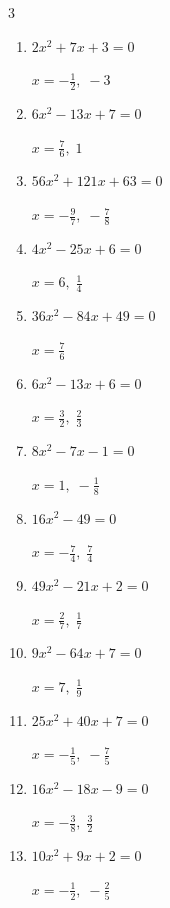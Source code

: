 \begin{multicols}{3}
\begin{enumerate}
  \item $2x^{2}+7x+3=0$

        $\displaystyle x=-\frac{1}{2},\; -3$

  \item $6x^{2}-13x+7=0$

        $\displaystyle x=\frac{7}{6},\; 1$

  \item $56x^{2}+121x+63=0$

        $\displaystyle x=-\frac{9}{7},\; -\frac{7}{8}$

  \item $4x^{2}-25x+6=0$

        $\displaystyle x=6,\; \frac{1}{4}$

  \item $36x^{2}-84x+49=0$

        $\displaystyle x=\frac{7}{6}$

  \item $6x^{2}-13x+6=0$

        $\displaystyle x=\frac{3}{2},\; \frac{2}{3}$

  \item $8x^{2}-7x-1=0$

        $\displaystyle x=1,\; -\frac{1}{8}$

\columnbreak %

  \item $16x^{2}-49=0$

        $\displaystyle x=-\frac{7}{4},\; \frac{7}{4}$

  \item $49x^{2}-21x+2=0$

        $\displaystyle x=\frac{2}{7},\; \frac{1}{7}$

  \item $9x^{2}-64x+7=0$

        $\displaystyle x=7,\; \frac{1}{9}$

  \item $25x^{2}+40x+7=0$

        $\displaystyle x=-\frac{1}{5},\; -\frac{7}{5}$

  \item $16x^{2}-18x-9=0$

        $\displaystyle x=-\frac{3}{8},\; \frac{3}{2}$

  \item $10x^{2}+9x+2=0$

        $\displaystyle x=-\frac{1}{2},\; -\frac{2}{5}$


\end{enumerate}
\end{multicols}
